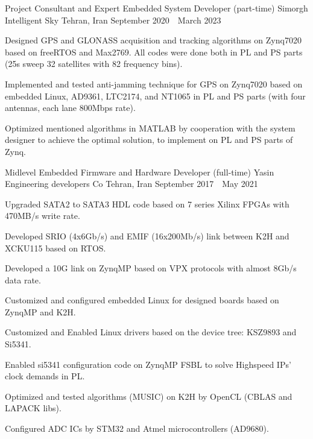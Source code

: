 \begin{cventries}
  \cventry
    {Project Consultant and Expert Embedded System Developer (part-time)} %
    {Simorgh Intelligent Sky} %
    {Tehran, Iran} %
    {September 2020~\textendash~March 2023} %
    {
      \begin{cvitems} %
        \item {Designed GPS and GLONASS acquisition and tracking algorithms on Zynq7020 based on freeRTOS and Max2769. All codes were done both in PL and PS parts (25s sweep 32 satellites with 82 frequency bins).}
        \item {Implemented and tested anti-jamming technique for GPS on Zynq7020 based on embedded Linux, AD9361, LTC2174, and NT1065 in PL and PS parts (with four antennas, each lane 800Mbps rate).}
	      \item {Optimized mentioned algorithms in MATLAB by cooperation with the system designer to achieve the optimal solution, to implement on PL and PS parts of Zynq.}
      \end{cvitems}
    }

  \cventry
    {Midlevel Embedded Firmware and Hardware Developer (full-time)} %
    {Yasin Engineering developers Co} %
    {Tehran, Iran} %
    {September 2017~\textendash~May 2021} %
    {
      \begin{cvitems} %
        \item {Upgraded SATA2 to SATA3 HDL code based on 7 series Xilinx FPGAs with 470MB/s write rate.}
        \item {Developed SRIO (4x6Gb/s) and EMIF (16x200Mb/s) link between K2H and XCKU115 based on RTOS.}
	      \item {Developed a 10G link on ZynqMP based on VPX protocols with almost 8Gb/s data rate.}
        \item {Customized and configured embedded Linux for designed boards based on ZynqMP and K2H.}
	      \item {Customized and Enabled Linux drivers based on the device tree: KSZ9893 and Si5341.}
        \item {Enabled si5341 configuration code on ZynqMP FSBL to solve Highspeed IPs' clock demands in PL.}
	      \item {Optimized and tested algorithms (MUSIC) on K2H by OpenCL (CBLAS and LAPACK libs).}
	      \item {Configured ADC ICs by STM32 and Atmel microcontrollers (AD9680).}
      \end{cvitems}
    }


\end{cventries}
